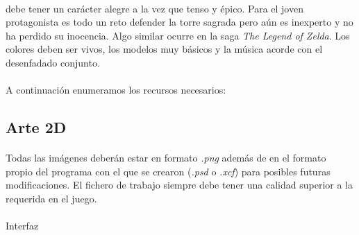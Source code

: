 \paragraph{}
\juego debe tener un carácter alegre a la vez que tenso y épico. Para el
joven protagonista es todo un reto defender la torre sagrada pero aún es inexperto
y no ha perdido su inocencia. Algo similar ocurre en la saga \emph{The Legend
of Zelda}. Los colores deben ser vivos, los modelos muy básicos y la música
acorde con el desenfadado conjunto.

\paragraph{}
A continuación enumeramos los recursos necesarios:

\subsection{Arte 2D}

\paragraph{}
Todas las imágenes deberán estar en formato \emph{.png} además de en el
formato propio del programa con el que se crearon (\emph{.psd} o \emph{.xcf})
para posibles futuras modificaciones. El fichero de trabajo siempre debe
tener una calidad superior a la requerida en el juego.

\paragraph{}
Interfaz

